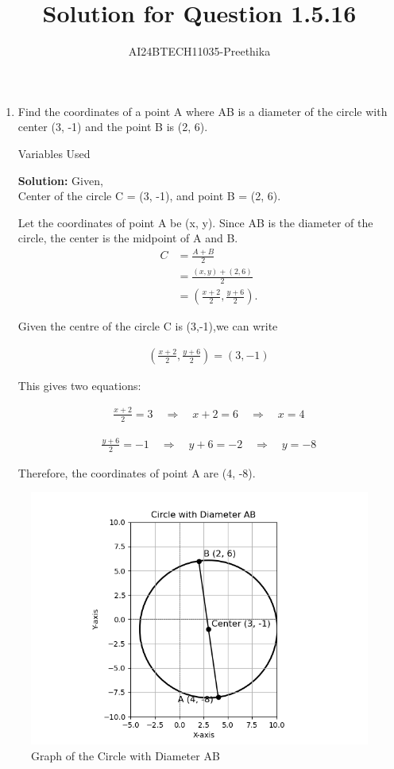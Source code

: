 \documentclass[journal,12pt,onecolumn]{IEEEtran}
\begin{document}


\vspace{3cm}
\title{Solution for Question 1.5.16}
\author{AI24BTECH11035-Preethika}
\maketitle

\begin{enumerate}
    \item Find the coordinates of a point A where AB is a diameter of the circle with center (3, -1) and the point B is (2, 6).\\
	    
\begin{table}[h!]
	\centering
  
	\caption{Variables Used}
	\label{tab1.5.16}
\end{table}
    \textbf{Solution:} Given,\\
    Center of the circle C = (3, -1), and point B = (2, 6).
    
    Let the coordinates of point A be (x, y).  
    Since AB is the diameter of the circle, the center is the midpoint of A and B.
	\begin{align}
		C &= \frac{A+B}{2} \\
		  &=\frac{(x,y) +(2,6)}{2} \\
		  &=\left(\frac{x+2}{2},\frac{y+6}{2}\right).
	\end{align}	  
    
		Given the centre of the circle C is (3,-1),we can write
    
		\begin{align}
    \left( \frac{x + 2}{2}, \frac{y + 6}{2} \right) = (3, -1)
		\end{align}
    
    This gives two equations:
    
		\begin{align}
    \frac{x + 2}{2} = 3 \quad \Rightarrow \quad x + 2 = 6 \quad \Rightarrow \quad x = 4
		\end{align}
    
		\begin{align}
    \frac{y + 6}{2} = -1 \quad \Rightarrow \quad y + 6 = -2 \quad \Rightarrow \quad y = -8
		\end{align}
    
    Therefore, the coordinates of point A are (4, -8).
    
\end{enumerate}

\begin{figure}[ht]
   \centering
   \includegraphics[width=0.7\linewidth]{Figs/fig_1.png}
   \caption{Graph of the Circle with Diameter AB}
   \label{q16}
\end{figure}
\end{document}
